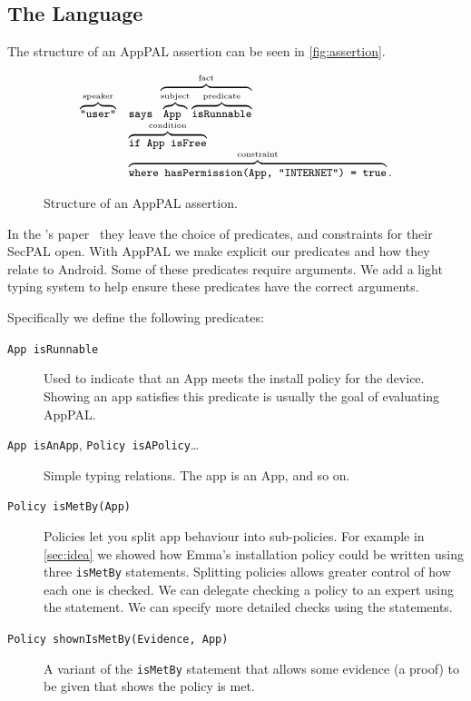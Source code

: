 \documentclass[]{scrartcl}
\begin{document}
\subsection{The Language}
\label{ssec:language}

The structure of an AppPAL assertion can be seen in \autoref{fig:assertion}.

\begin{figure}
  \centering
  \begin{equation*}\small
    \begin{array}{r l}
      \overbrace{\text{\ttfamily "user"}}^{\text{speaker}} &
      \text{\ttfamily says }\overbrace{\overbrace{\text{\ttfamily App }}^{\text{subject}}\overbrace{\text{\ttfamily isRunnable}}^{\text{predicate}}}^{\text{fact}} \\
      & \overbrace{\text{\ttfamily if App isFree}}^{\text{condition}} \\
      & \overbrace{\text{\ttfamily where hasPermission(App, "INTERNET") = true}}^{\text{constraint}}.
    \end{array}
  \end{equation*}
  \caption{Structure of an AppPAL assertion.}
\label{fig:assertion}
\end{figure}

In the \citeauthor{Becker:2006vh}'s paper~\citep{Becker:2006vh} they leave the choice of predicates, and constraints for their SecPAL open.
With AppPAL we make explicit our predicates and how they relate to Android.
Some of these predicates require arguments.
We add a light typing system to help ensure these predicates have the correct arguments.

Specifically we define the following predicates:
\begin{description}
  \item[\texttt{App isRunnable}]
    Used to indicate that an App meets the install policy for the device.
    Showing an app satisfies this predicate is usually the goal of evaluating AppPAL.

  \item[\texttt{App isAnApp}, \texttt{Policy isAPolicy}\ldots]
    Simple typing relations.
    The app  is an App, and so on.

  \item[\texttt{Policy isMetBy(App)}]
    Policies let you split app behaviour into sub-policies.
    For example in \autoref{sec:idea} we showed how Emma's installation policy could be written using three \texttt{isMetBy} statements.
    Splitting policies allows greater control of how each one is checked.
    We can delegate checking a policy to an expert using the  statement.
    We can specify more detailed checks using the  statements.

  \item[\texttt{Policy shownIsMetBy(Evidence, App)}]
    A variant of the \texttt{isMetBy} statement that allows some evidence (a proof) to be given that shows the policy is met.
\end{description}
\end{document}
